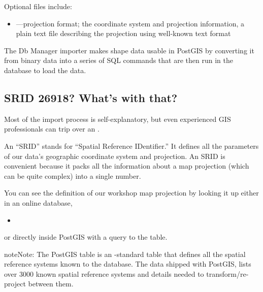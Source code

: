 \documentclass[a4paper,11pt,english]{sphinxmanual}
\begin{document}
Optional files include:
\begin{itemize}
\item {} 
—projection format; the coordinate system and projection information, a plain text file describing the projection using well-known text format

\end{itemize}

The Db Manager importer makes shape data usable in PostGIS by converting it from binary data into a series of SQL commands that are then run in the database to load the data.


\subsection{SRID 26918? What’s with that?}
\label{\detokenize{setup:srid-26918-what-s-with-that}}
Most of the import process is self-explanatory, but even experienced GIS professionals can trip over an .

An “SRID” stands for “Spatial Reference IDentifier.” It defines all the parameters of our data’s geographic coordinate system and projection. An SRID is convenient because it packs all the information about a map projection (which can be quite complex) into a single number.

You can see the definition of our workshop map projection by looking it up either in an online database,
\begin{itemize}
\item {} 

\end{itemize}

or directly inside PostGIS with a query to the  table.

\begin{sphinxVerbatim}[commandchars=\\\{\}]
       
\end{sphinxVerbatim}

\begin{sphinxadmonition}{note}{Note:}
The PostGIS  table is an {\hyperref[\detokenize{glossary:term-ogc}]{}}-standard table that defines all the spatial reference systems known to the database. The data shipped with PostGIS, lists over 3000 known spatial reference systems and details needed to transform/re-project between them.
\end{sphinxadmonition}
\end{document}
